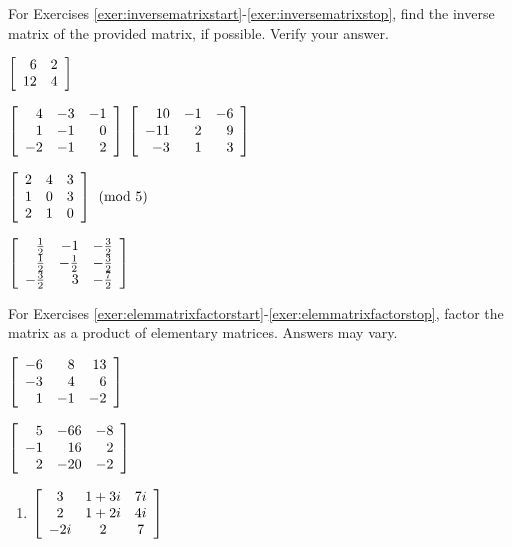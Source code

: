 \noindent For Exercises \ref{exer:inversematrixstart}-\ref{exer:inversematrixstop}, find the inverse matrix of the provided matrix, if possible. Verify your answer.
\begin{enumerate}[!HW!]
\begin{multicols}{3}
\item\label{exer:inversematrixstart} $\mtx{rr}{6&2\\12&4}$  %
\item $\mtx{rrr}{4&-3&-1\\1&-1&0\\-2&-1&2}$ %
\itemspade $\mtx{rrr}{10&-1&-6\\-11&2&9\\-3&1&3}$
\end{multicols}
\begin{multicols}{3}
\itemspade $\mtx{rrr}{2&4&3\\1&0&3\\2&1&0} \pmod 5$
\item\label{exer:inversematrixstop} $\mtx{rrr}{\frac{1}{2}&-1&-\frac{3}{2}\\\frac{1}{2}&-\frac{1}{2}&-\frac{3}{2}\\-\frac{3}{2}&3&-\frac{7}{2}}$ %
\end{multicols}
\end{enumerate}

\noindent For Exercises \ref{exer:elemmatrixfactorstart}-\ref{exer:elemmatrixfactorstop}, factor the matrix as a product of elementary matrices. Answers may vary.
\begin{enumerate}[!HW!, label=$\spadesuit$ \arabic*., ref=\arabic*]
\begin{multicols}{3}
\item\label{exer:elemmatrixfactorstart} $\mtx{rrr}{-6&8&13\\-3&4&6\\1&-1&-2}$
\item $\mtx{rrr}{5&-66&-8\\-1&16&2\\2&-20&-2}$ 
\end{multicols}
\end{enumerate}
\begin{enumerate}[!HW!]
\item\label{exer:elemmatrixfactorstop} $\mtx{ccc}{3&1+3i&7i\\2&1+2i&4i\\-2i&2&7}$ %
\end{enumerate}

